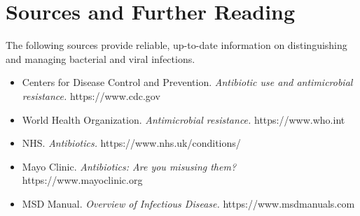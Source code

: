 \section*{Sources and Further Reading}
The following sources provide reliable, up-to-date information on distinguishing and managing bacterial and viral infections.
\begin{itemize}
    \item Centers for Disease Control and Prevention. \textit{Antibiotic use and antimicrobial resistance.} https://www.cdc.gov
    \item World Health Organization. \textit{Antimicrobial resistance.} https://www.who.int
    \item NHS. \textit{Antibiotics.} https://www.nhs.uk/conditions/
    \item Mayo Clinic. \textit{Antibiotics: Are you misusing them?} https://www.mayoclinic.org
    \item MSD Manual. \textit{Overview of Infectious Disease.} https://www.msdmanuals.com
\end{itemize}
